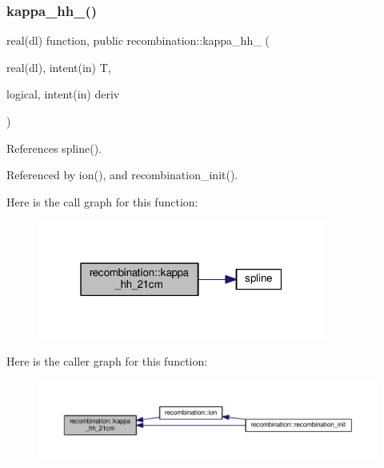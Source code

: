 \subsubsection{\texorpdfstring{kappa\+\_\+hh\+\_\+21cm()}{kappa\_hh\_21cm()}}
{\footnotesize\ttfamily real(dl) function, public recombination\+::kappa\+\_\+hh\+\_\+21cm (\begin{DoxyParamCaption}\item[{real(dl), intent(in)}]{T,  }\item[{logical, intent(in)}]{deriv }\end{DoxyParamCaption})}



References spline().



Referenced by ion(), and recombination\+\_\+init().

Here is the call graph for this function\+:
\nopagebreak
\begin{figure}[H]
\begin{center}
\leavevmode
\includegraphics[width=268pt]{namespacerecombination_a6456c5ea7f228fa74eba8e54de9eded5_cgraph}
\end{center}
\end{figure}
Here is the caller graph for this function\+:
\nopagebreak
\begin{figure}[H]
\begin{center}
\leavevmode
\includegraphics[width=350pt]{namespacerecombination_a6456c5ea7f228fa74eba8e54de9eded5_icgraph}
\end{center}
\end{figure}
\mbox{\label{namespacerecombination_a27e7c8f022215a5bb27a45d2b5db20bb}} 
